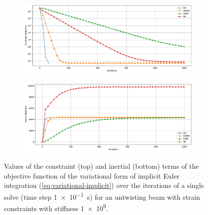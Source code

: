 \begin{figure}[h]
    \centering
    \begin{subfigure}{\textwidth}
        \includegraphics[width=\linewidth]{figures/strain_beam_untwist_constraintObjectives_large_ts.pdf}
    \end{subfigure}
    \begin{subfigure}{\textwidth}
        \includegraphics[width=\linewidth]{figures/strain_beam_untwist_inertialObjectives_large_ts.pdf}
    \end{subfigure}
    \caption{Values of the constraint (top) and inertial (bottom) terms of the objective function of the variational form of implicit Euler integration 
        (\cref{eq:variational-implicit}) over the iterations of a single solve (time step \SI{1e-1}{\second}) for an untwisting beam with strain 
    constraints with stiffness \num{1e9}.}
    \label{fig:strain-beam-untwist-objectives-split-large-ts}
\end{figure}

